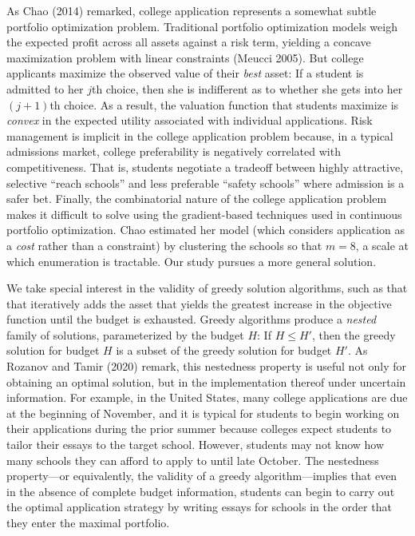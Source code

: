 \documentclass[12pt]{article} %
\theoremstyle{definition}
\theoremstyle{definition}
\begin{document}
As Chao (2014) remarked, college application represents a somewhat subtle portfolio optimization problem. Traditional portfolio optimization models weigh the expected profit across all assets against a risk term, yielding a concave maximization problem with linear constraints (Meucci 2005). But college applicants maximize the observed value of their \emph{best} asset: If a student is admitted to her $j$th choice, then she is indifferent as to whether she gets into her $(j+1)$th choice. As a result, the valuation function that students maximize is \emph{convex} in the expected utility associated with individual applications. Risk management is implicit in the college application problem because, in a typical admissions market, college preferability is negatively correlated with competitiveness. That is, students  negotiate a tradeoff between highly attractive, selective “reach schools” and less preferable “safety schools” where admission is a safer bet. Finally, the combinatorial nature of the college application problem makes it difficult to solve using the gradient-based techniques used in continuous portfolio optimization. Chao estimated her model (which considers application as a \emph{cost} rather than a constraint) by clustering the schools so that $m=8$, a scale at which enumeration is tractable. Our study pursues a more general solution.

We take special interest in the validity of greedy solution algorithms, such as that that iteratively adds the asset that yields the greatest increase in the objective function until the budget is exhausted. Greedy algorithms produce a \emph{nested} family of solutions, parameterized by the budget $H$: If $H \leq H'$, then the greedy solution for budget $H$ is a subset of the greedy solution for budget $H'$. As Rozanov and Tamir (2020) remark, this nestedness property is useful not only for obtaining an optimal solution, but in the implementation thereof under uncertain information. For example, in the United States, many college applications are due at the beginning of November, and it is typical for students to begin working on their applications during the prior summer because colleges expect students to tailor their essays to the target school. However, students may not know how many schools they can afford to apply to until late October. The nestedness property---or equivalently, the validity of a greedy algorithm---implies that even in the absence of complete budget information, students can begin to carry out the optimal application strategy by writing essays for schools in the order that they enter the maximal portfolio.
\end{document}
